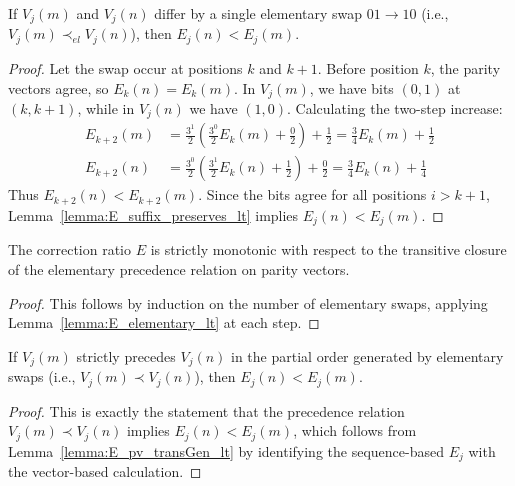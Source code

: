 \begin{lemma}\label{lemma:E_elementary_lt}\leanok
If $V_j(m)$ and $V_j(n)$ differ by a single elementary swap $01 \to 10$ (i.e., $V_j(m) \prec_{el} V_j(n)$), then $E_j(n) < E_j(m)$.
\end{lemma}
\begin{proof}\leanok
Let the swap occur at positions $k$ and $k+1$. Before position $k$, the parity vectors agree, so $E_k(n) = E_k(m)$. In $V_j(m)$, we have bits $(0, 1)$ at $(k, k+1)$, while in $V_j(n)$ we have $(1, 0)$.
Calculating the two-step increase:
\begin{align*}
    E_{k+2}(m) &= \frac{3^1}{2} \left( \frac{3^0}{2} E_k(m) + \frac{0}{2} \right) + \frac{1}{2} = \frac{3}{4} E_k(m) + \frac{1}{2} \\
    E_{k+2}(n) &= \frac{3^0}{2} \left( \frac{3^1}{2} E_k(n) + \frac{1}{2} \right) + \frac{0}{2} = \frac{3}{4} E_k(n) + \frac{1}{4}
\end{align*}
Thus $E_{k+2}(n) < E_{k+2}(m)$. Since the bits agree for all positions $i > k+1$, Lemma~\ref{lemma:E_suffix_preserves_lt} implies $E_j(n) < E_j(m)$.
\end{proof}

\begin{lemma}\label{lemma:E_pv_transGen_lt}\leanok
The correction ratio $E$ is strictly monotonic with respect to the transitive closure of the elementary precedence relation on parity vectors.
\end{lemma}
\begin{proof}\leanok
This follows by induction on the number of elementary swaps, applying Lemma~\ref{lemma:E_elementary_lt} at each step.
\end{proof}

\begin{theorem}\label{theorem:E_lt_of_V_precedes}\leanok
If $V_j(m)$ strictly precedes $V_j(n)$ in the partial order generated by elementary swaps (i.e., $V_j(m) \prec V_j(n)$), then $E_j(n) < E_j(m)$.
\end{theorem}
\begin{proof}\leanok
This is exactly the statement that the precedence relation $V_j(m) \prec V_j(n)$ implies $E_j(n) < E_j(m)$, which follows from Lemma~\ref{lemma:E_pv_transGen_lt} by identifying the sequence-based $E_j$ with the vector-based calculation.
\end{proof}
